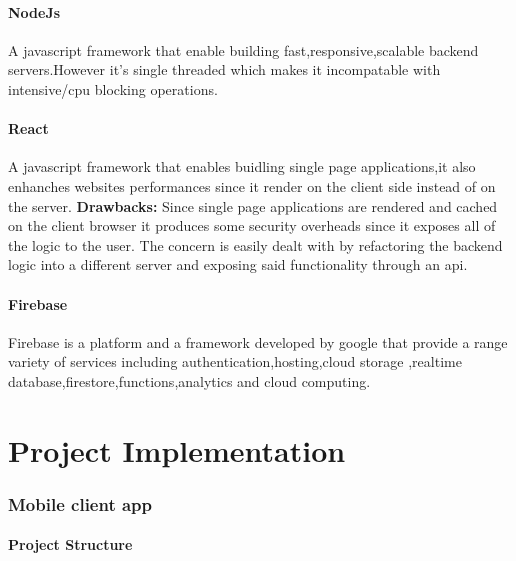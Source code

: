 \documentclass{article}
\begin{document}
\subsection{NodeJs}
A javascript framework that enable building fast,responsive,scalable backend servers.However it's single threaded which makes it incompatable with intensive/cpu blocking operations.
\subsection{React}
A javascript framework that enables buidling single page applications,it also enhanches websites performances since it render on the client side instead of on the server.\linebreak
\textbf{Drawbacks:}
Since single page applications are rendered and cached on the client browser it produces some security overheads since it exposes all of the logic to the user.
The concern is easily dealt with by refactoring the backend logic into a different server and exposing said functionality through an api.
\subsection{Firebase}
Firebase is a platform and a framework developed by google that provide a range variety of services including authentication,hosting,cloud storage ,realtime database,firestore,functions,analytics and cloud computing.


\part{Project Implementation}
\section{Mobile client app}
\subsection{Project Structure}
\end{document}
